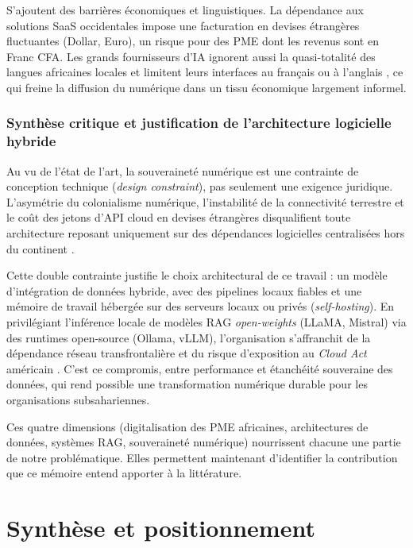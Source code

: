 S'ajoutent des barrières économiques et linguistiques. La dépendance aux solutions SaaS occidentales impose une facturation en devises étrangères fluctuantes (Dollar, Euro), un risque pour des PME dont les revenus sont en Franc CFA. Les grands fournisseurs d'IA ignorent aussi la quasi-totalité des langues africaines locales et limitent leurs interfaces au français ou à l'anglais \cite{nothiasIntellectualHistoryDigital2025}, ce qui freine la diffusion du numérique dans un tissu économique largement informel.

\subsubsection{Synthèse critique et justification de l'architecture logicielle hybride}

Au vu de l'état de l'art, la souveraineté numérique est une contrainte de conception technique (\textit{design constraint}), pas seulement une exigence juridique. L'asymétrie du colonialisme numérique, l'instabilité de la connectivité terrestre et le coût des jetons d'API cloud en devises étrangères disqualifient toute architecture reposant uniquement sur des dépendances logicielles centralisées hors du continent \cite{anssibsiCloudSovereignty2025, nothiasIntellectualHistoryDigital2025}.

Cette double contrainte justifie le choix architectural de ce travail : un modèle d'intégration de données hybride, avec des pipelines locaux fiables et une mémoire de travail hébergée sur des serveurs locaux ou privés (\textit{self-hosting}). En privilégiant l'inférence locale de modèles RAG \textit{open-weights} (LLaMA, Mistral) via des runtimes open-source (Ollama, vLLM), l'organisation s'affranchit de la dépendance réseau transfrontalière et du risque d'exposition au \textit{Cloud Act} américain \cite{anssibsiCloudSovereignty2025}. C'est ce compromis, entre performance et étanchéité souveraine des données, qui rend possible une transformation numérique durable pour les organisations subsahariennes.

Ces quatre dimensions (digitalisation des PME africaines, architectures de données, systèmes RAG, souveraineté numérique) nourrissent chacune une partie de notre problématique. Elles permettent maintenant d'identifier la contribution que ce mémoire entend apporter à la littérature.


\section{Synthèse et positionnement}
\label{sec:Synthèse_positionnement} 


